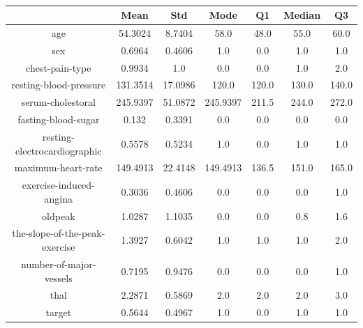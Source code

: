 \documentclass{classrep}
\begin{document}
{{{                \begin{table}[!htbp]
                    \centering
                    \begin{tabular}{|c|c|c|c|c|c|c|}
                        \hline
                        & Mean & Std & Mode & Q1 & Median & Q3 \\ \hline
                        age & 54.3024 & 8.7404 & 58.0 & 48.0 & 55.0 & 60.0 \\ \hline
                        sex & 0.6964 & 0.4606 & 1.0 & 0.0 & 1.0 & 1.0 \\ \hline
                        chest-pain-type & 0.9934 & 1.0 & 0.0 & 0.0 & 1.0 & 2.0 \\ \hline
                        resting-blood-pressure & 131.3514 & 17.0986 & 120.0 & 120.0 & 130.0 & 140.0 \\ \hline
                        serum-cholestoral & 245.9397 & 51.0872 & 245.9397 & 211.5 & 244.0 & 272.0 \\ \hline
                        fasting-blood-sugar & 0.132 & 0.3391 & 0.0 & 0.0 & 0.0 & 0.0 \\ \hline
                        resting-electrocardiographic & 0.5578 & 0.5234 & 1.0 & 0.0 & 1.0 & 1.0 \\ \hline
                        maximum-heart-rate & 149.4913 & 22.4148 & 149.4913 & 136.5 & 151.0 & 165.0 \\ \hline
                        exercise-induced-angina & 0.3036 & 0.4606 & 0.0 & 0.0 & 0.0 & 1.0 \\ \hline
                        oldpeak & 1.0287 & 1.1035 & 0.0 & 0.0 & 0.8 & 1.6 \\ \hline
                        the-slope-of-the-peak-exercise & 1.3927 & 0.6042 & 1.0 & 1.0 & 1.0 & 2.0 \\ \hline
                        number-of-major-vessels & 0.7195 & 0.9476 & 0.0 & 0.0 & 0.0 & 1.0 \\ \hline
                        thal & 2.2871 & 0.5869 & 2.0 & 2.0 & 2.0 & 3.0 \\ \hline
                        target & 0.5644 & 0.4967 & 1.0 & 0.0 & 1.0 & 1.0 \\ \hline
                    \end{tabular}
                    \caption{}
                    \label{result_5_Mean-imputation}
                \end{table}
                \FloatBarrier

}}}
\end{document}
